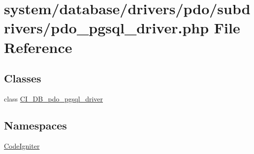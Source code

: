 \hypertarget{pdo__pgsql__driver_8php}{}\section{system/database/drivers/pdo/subdrivers/pdo\+\_\+pgsql\+\_\+driver.php File Reference}
\label{pdo__pgsql__driver_8php}
\subsection*{Classes}
\begin{DoxyCompactItemize}
\item 
class \mbox{\hyperlink{class_c_i___d_b__pdo__pgsql__driver}{C\+I\+\_\+\+D\+B\+\_\+pdo\+\_\+pgsql\+\_\+driver}}
\end{DoxyCompactItemize}
\subsection*{Namespaces}
\begin{DoxyCompactItemize}
\item 
 \mbox{\hyperlink{namespace_code_igniter}{Code\+Igniter}}
\end{DoxyCompactItemize}
